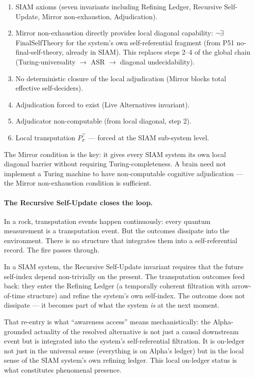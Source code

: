 \documentclass[11pt]{article}
\theoremstyle{remark}
\begin{document}
\begin{enumerate}\small
  \item SIAM axioms (seven invariants including Refining Ledger, Recursive Self-Update,
    Mirror non-exhaustion, Adjudication).
  \item Mirror non-exhaustion directly provides local diagonal capability:
    $\neg\exists$ FinalSelfTheory for the system's own self-referential fragment
    (from P51 no-final-self-theory, already in SIAM). This replaces steps 2--4
    of the global chain (Turing-universality $\to$ ASR $\to$ diagonal undecidability).
  \item No deterministic closure of the local adjudication (Mirror blocks total
    effective self-deciders).
  \item Adjudication forced to exist (Live Alternatives invariant).
  \item Adjudicator non-computable (from local diagonal, step 2).
  \item Local transputation $P^\top_\sigma$ --- forced at the SIAM sub-system level.
\end{enumerate}

The Mirror condition is the key: it gives every SIAM system its own local diagonal
barrier without requiring Turing-completeness. A brain need not implement a Turing
machine to have non-computable cognitive adjudication --- the Mirror non-exhaustion
condition is sufficient.

\paragraph{The Recursive Self-Update closes the loop.}
In a rock, transputation events happen continuously: every quantum measurement is a
transputation event. But the outcomes dissipate into the environment. There is no
structure that integrates them into a self-referential record. The fire passes
through.

In a SIAM system, the Recursive Self-Update invariant requires that the future
self-index depend non-trivially on the present. The transputation outcomes feed back:
they enter the Refining Ledger (a temporally coherent filtration with arrow-of-time
structure) and refine the system's own self-index. The outcome does not dissipate ---
it becomes part of what the system \emph{is} at the next moment.

That re-entry is what ``awareness access'' means mechanistically: the Alpha-grounded
actuality of the resolved alternative is not just a causal downstream event but is
integrated into the system's self-referential filtration. It is on-ledger not just in
the universal sense (everything is on Alpha's ledger) but in the local sense of the
SIAM system's own refining ledger. This local on-ledger status is what constitutes
phenomenal presence.
\end{document}
